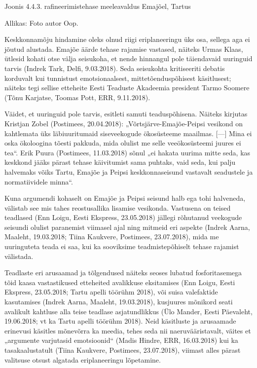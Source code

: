 \documentclass[estonian,]{article}
\begin{document}
{Joonis 4.4.3.} rafineerimistehase meeleavaldus Emajõel, Tartus

\begin{imgsource}
{Allikas:} Foto autor Oop.
\end{imgsource}

Keskkonnamõju hindamine oleks olnud riigi eriplaneeringu üks osa, sellega aga ei jõutud alustada. Emajõe äärde tehase rajamise vastased, näiteks Urmas Klaas, ütlesid kohati otse välja seisukoha, et nende hinnangul pole täiendavaid uuringuid tarvis (Indrek Tark, Delfi, 9.03.2018). Seda seisukohta kritiseeriti debatis korduvalt kui tunnistust emotsionaalsest, mittetõenduspõhisest käsitlusest; näiteks tegi sellise etteheite Eesti Teaduste Akadeemia president Tarmo Soomere (Tõnu Karjatse, Toomas Pott, ERR, 9.11.2018).

Väidet, et uuringuid pole tarvis, esitleti samuti teaduspõhisena. Näiteks kirjutas Kristjan Zobel (Postimees, 20.04.2018): „Võrtsjärve-Emajõe-Peipsi vesikond on kahtlemata üks läbiuuritumaid siseveekogude ökosüsteeme maailmas. {[}---{]} Mina ei oska ökoloogina tõesti pakkuda, mida olulist me selle veeökosüsteemi juures ei tea``. Erik Puura (Postimees, 11.03.2018) sõnul „ei hakata uurima mitte seda, kas keskkond jääks pärast tehase käivitumist sama puhtaks, vaid seda, kui palju halvemaks võiks Tartu, Emajõe ja Peipsi keskkonnaseisund vastavalt seadustele ja normatiividele minna``.

Kuna argumendi kohaselt on Emajõe ja Peipsi seisund halb ega tohi halveneda, välistab see mis tahes reostusallika lisamise vesikonda. Vastusena on teised teadlased (Enn Loigu, Eesti Ekspress, 23.05.2018) jällegi rõhutanud veekogude seisundi olulist paranemist viimasel ajal ning mitmeid eri aspekte (Indrek Aarna, Maaleht, 19.03.2018; Tiina Kaukvere, Postimees, 23.07.2018), mida me uuringuteta teada ei saa, kui ka sooviksime teadmistepõhiselt tehase rajamist välistada.

Teadlaste eri arusaamad ja tõlgendused näiteks seoses lubatud fosforitasemega tõid kaasa vastastikused etteheited avalikkuse eksitamises (Enn Loigu, Eesti Ekspress, 23.05.2018; Tartu apelli töörühm 2018), või suisa valefaktide kasutamises (Indrek Aarna, Maaleht, 19.03.2018), kusjuures mõnikord seati avalikult kahtluse alla teise teadlase asjatundlikkus (Ülo Mander, Eesti Päevaleht, 19.06.2018; vt ka Tartu apelli töörühm 2018). Neid käsitluste ja arusaamade erinevusi käsitles mõnevõrra ka meedia, tehes seda nii naeruvääristavalt, väites et „argumente varjutasid emotsioonid`` (Madis Hindre, ERR, 16.03.2018) kui ka tasakaalustatult (Tiina Kaukvere, Postimees, 23.07.2018), viimast alles pärast valitsuse otsust algatada eriplaneeringu lõpetamine.
\end{document}
